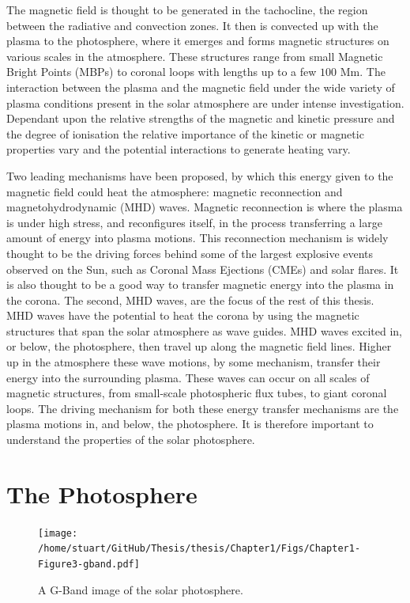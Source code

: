 \documentclass[a4paper,12pt,fourier,authoryear,custommargin]{Classes/PhDThesisPSnPDF}
\begin{document}
The magnetic field is thought to be generated in the tachocline, the region between the radiative and convection zones.
It then is convected up with the plasma to the photosphere, where it emerges and forms magnetic structures on various scales in the atmosphere.
These structures range from small Magnetic Bright Points (MBPs) to coronal loops with lengths up to a few $100$ Mm.
The interaction between the plasma and the magnetic field under the wide variety of plasma conditions present in the solar atmosphere are under intense investigation.
Dependant upon the relative strengths of the magnetic and kinetic pressure and the degree of ionisation the relative importance of the kinetic or magnetic properties vary and the potential interactions to generate heating vary.

Two leading mechanisms have been proposed, by which this energy given to the magnetic field could heat the atmosphere: magnetic reconnection and magnetohydrodynamic (MHD) waves.
Magnetic reconnection is where the plasma is under high stress, and reconfigures itself, in the process transferring a large amount of energy into plasma motions.
This reconnection mechanism is widely thought to be the driving forces behind some of the largest explosive events observed on the Sun, such as Coronal Mass Ejections (CMEs) and solar flares.
It is also thought to be a good way to transfer magnetic energy into the plasma in the corona.
The second, MHD waves, are the focus of the rest of this thesis.
MHD waves have the potential to heat the corona by using the magnetic structures that span the solar atmosphere as wave guides.
MHD waves excited in, or below, the photosphere, then travel up along the magnetic field lines.
Higher up in the atmosphere these wave motions, by some mechanism, transfer their energy into the surrounding plasma.
These waves can occur on all scales of magnetic structures, from small-scale photospheric flux tubes, to giant coronal loops.
The driving mechanism for both these energy transfer mechanisms are the plasma motions in, and below, the photosphere.
It is therefore important to understand the properties of the solar photosphere.

\section{The Photosphere} 



\begin{figure}[h]
    \centering
    \texttt{[image: /home/stuart/GitHub/Thesis/thesis/Chapter1/Figs/Chapter1-Figure3-gband.pdf]}
    \caption{A G-Band image of the solar photosphere.}
    \label{fig:gband}
\end{figure}
\end{document}
